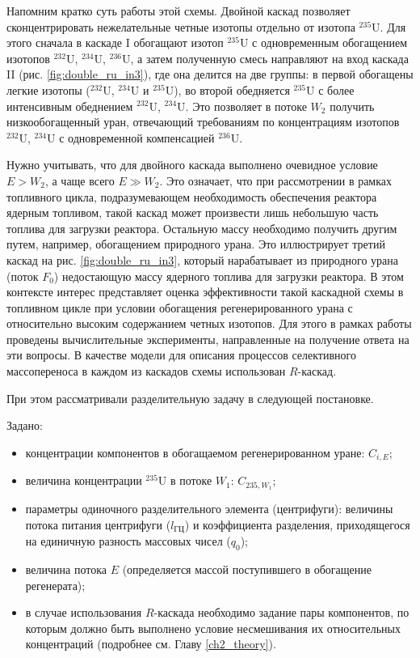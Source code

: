 Напомним кратко суть работы этой схемы. Двойной каскад позволяет сконцентрировать нежелательные четные изотопы отдельно от изотопа $^{235}$U. Для этого сначала в каскаде I обогащают изотоп $^{235}$U с одновременным обогащением изотопов $^{232}$U, $^{234}$U, $^{236}$U, а затем полученную смесь направляют на вход каскада II (рис. \ref{fig:double_ru_in3}), где она делится на две группы: в первой обогащены легкие изотопы ($^{232}$U, $^{234}$U и $^{235}$U), во второй обедняется $^{235}$U с более интенсивным обеднением $^{232}$U, $^{234}$U. Это позволяет в потоке $W_2$ получить низкообогащенный уран, отвечающий требованиям по концентрациям изотопов $^{232}$U, $^{234}$U с одновременной компенсацией $^{236}$U.

Нужно учитывать, что для двойного каскада выполнено очевидное условие $E>W_2$, а чаще всего $E \gg W_2$. Это означает, что при рассмотрении в рамках топливного цикла, подразумевающем необходимость обеспечения реактора ядерным топливом, такой каскад может произвести лишь небольшую часть топлива для загрузки реактора. Остальную массу необходимо получить другим путем, например, обогащением природного урана. Это иллюстрирует третий каскад на рис. \ref{fig:double_ru_in3}, который нарабатывает из природного урана (поток $F_0$) недостающую массу ядерного топлива для загрузки реактора. В этом контексте интерес представляет оценка эффективности такой каскадной схемы в топливном цикле при условии обогащения регенерированного урана с относительно высоким содержанием четных изотопов. Для этого в рамках работы проведены вычислительные эксперименты, направленные на получение ответа на эти вопросы. В качестве модели для описания процессов селективного массопереноса в каждом из каскадов схемы использован $R$-каскад. 

При этом рассматривали разделительную задачу в следующей постановке.

Задано:

\begin{itemize}
    \item концентрации компонентов в обогащаемом регенерированном уране: $C_{i,{E}}$; 
    \item величина концентрации $^{235}$U в потоке $W_{1}$: $C_{235,{W_1}}$;
    \item параметры одиночного разделительного элемента (центрифуги): величины потока питания центрифуги ($l_{ГЦ}$) и коэффициента разделения, приходящегося на единичную разность массовых чисел ($q_{0}$);
    \item величина потока $E$ (определяется массой поступившего в обогащение регенерата);
    \item в случае использования $R$-каскада необходимо задание пары компонентов, по которым должно быть выполнено условие несмешивания их относительных концентраций (подробнее см. Главу \ref{ch2_theory}).
\end{itemize}

